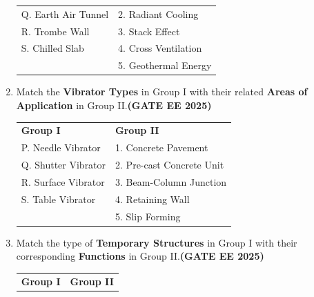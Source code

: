 \documentclass[journal,12pt,onecolumn]{IEEEtran}
\theoremstyle{remark}
\begin{document}
\begin{enumerate}
\begin{tabular}{p{}p{}}
Q. Earth Air Tunnel & 2. Radiant Cooling\\
R. Trombe Wall  & 3. Stack Effect\\
S. Chilled Slab  & 4. Cross Ventilation\\
         & 5. Geothermal Energy\\
\end{tabular}
\begin{enumerate}
\end{enumerate}
\item Match the \textbf{Vibrator Types} in Group I with their related \textbf{Areas of Application} in Group II.\hfill \textbf{(GATE EE 2025)}\\
\begin{tabular}{p{}p{}}
\textbf{Group I} & \textbf{Group II}\\
P. Needle Vibrator     &1. Concrete Pavement  \\
Q. Shutter Vibrator     &2. Pre-cast Concrete Unit\\
R. Surface Vibrator    & 3. Beam-Column Junction\\
S. Table Vibrator   & 4. Retaining Wall\\
     & 5. Slip Forming\\
\end{tabular}
\begin{enumerate}
\end{enumerate}
\item Match the type of \textbf{Temporary Structures} in Group I with their corresponding \textbf{Functions} in Group II.\hfill \textbf{(GATE EE 2025)}
\begin{tabular}{p{}p{}}
\textbf{Group I} & \textbf{Group II} \\

\end{tabular}
\end{enumerate}
\end{document}
